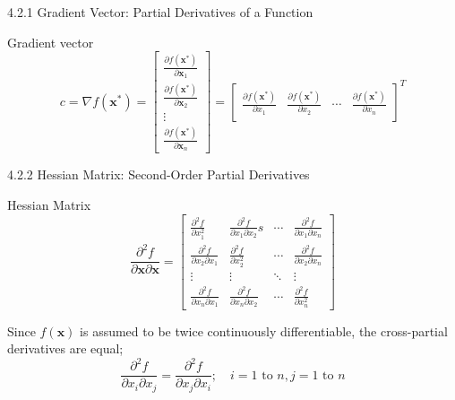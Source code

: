 \documentclass[aspectratio=169,xcolor=dvipsnames]{beamer}
\begin{document}
\begin{frame}{4.2.1 Gradient Vector: Partial Derivatives of a Function}

\begin{block}{Gradient vector}
    \begin{equation*}
        c 
        =  \nabla f(\mathbf{x}^*) 
        = \begin{bmatrix}
            \frac{\partial f(\mathbf{x}^*)}{\partial \mathbf{x}_1} \\
            \frac{\partial f(\mathbf{x}^*)}{\partial \mathbf{x}_2} \\
            \vdots \\
            \frac{\partial f(\mathbf{x}^*)}{\partial \mathbf{x}_n}
        \end{bmatrix}
        = \begin{bmatrix}
            \frac{\partial f(\mathbf{x^*})}{\partial x_1} & \frac{\partial f(\mathbf{x^*})}{\partial x_2} & \cdots & \frac{\partial f(\mathbf{x^*})}{\partial x_n}
        \end{bmatrix}^T
    \end{equation*}
\end{block}

\end{frame}

\begin{frame}{4.2.2 Hessian Matrix: Second-Order Partial Derivatives}

\begin{block}{Hessian Matrix}
    \begin{equation*}
        \frac{\partial^2 f}{\partial \mathbf{x} \partial \mathbf{x}}
        = \begin{bmatrix}
            \frac{\partial^2 f}{\partial x^2_1} & \frac{\partial^2 f}{\partial x_1 \partial x_2}s & \cdots & \frac{\partial^2 f}{\partial x_1 \partial x_n} \\
            \frac{\partial^2 f}{\partial x_2 \partial x_1} & \frac{\partial^2 f}{\partial x^2_2} & \cdots & \frac{\partial^2 f}{\partial x_2 \partial x_n} \\
            \vdots & \vdots & \ddots & \vdots \\
            \frac{\partial^2 f}{\partial x_n \partial x_1} & \frac{\partial^2 f}{\partial x_n \partial x_2} & \cdots & \frac{\partial^2 f}{\partial x^2_n}
        \end{bmatrix}
    \end{equation*}
\end{block}
Since $f(\mathbf{x})$ is assumed to be twice continuously differentiable, the cross-partial derivatives are equal;
\begin{equation*}
    \frac{\partial^2 f}{\partial x_i \partial x_j} = \frac{\partial^2 f}{\partial x_j \partial x_i}; \quad i = 1 \text{ to } n, j = 1 \text{ to } n
\end{equation*}
\end{frame}
\end{document}
